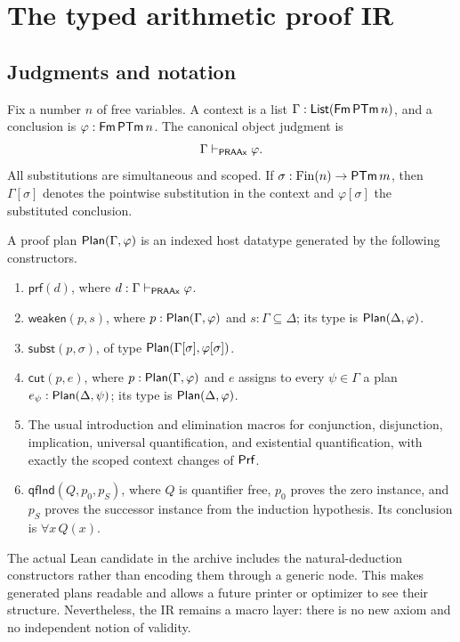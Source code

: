 \section{The typed arithmetic proof IR}\label{sec:typed-ir}

\subsection{Judgments and notation}

Fix a number \(n\) of free variables.  A context is a list
\(\Gamma:\mathsf{List}(\mathsf{Fm}\,\mathsf{PTm}\,n)\), and a conclusion is
\(\varphi:\mathsf{Fm}\,\mathsf{PTm}\,n\).  The canonical object judgment is
\[
  \Gamma\vdash_{\mathsf{PRAAx}}\varphi.
\]
All substitutions are simultaneous and scoped.  If
\(\sigma:\mathrm{Fin}(n)\to\mathsf{PTm}\,m\), then
\(\Gamma[\sigma]\) denotes the pointwise substitution in the context and
\(\varphi[\sigma]\) the substituted conclusion.

\begin{definition}
A proof plan \(\mathsf{Plan}(\Gamma,\varphi)\) is an indexed host datatype generated by the following
constructors.

\begin{enumerate}
\item \(\mathsf{prf}(d)\), where \(d:\Gamma\vdash_{\mathsf{PRAAx}}\varphi\).
\item \(\mathsf{weaken}(p,s)\), where \(p:\mathsf{Plan}(\Gamma,\varphi)\) and
      \(s:\Gamma\subseteq\Delta\); its type is \(\mathsf{Plan}(\Delta,\varphi)\).
\item \(\mathsf{subst}(p,\sigma)\), of type
      \(\mathsf{Plan}(\Gamma[\sigma],\varphi[\sigma])\).
\item \(\mathsf{cut}(p,e)\), where \(p:\mathsf{Plan}(\Gamma,\varphi)\) and
      \(e\) assigns to every \(\psi\in\Gamma\) a plan \(e_\psi:\mathsf{Plan}(\Delta,\psi)\);
      its type is \(\mathsf{Plan}(\Delta,\varphi)\).
\item The usual introduction and elimination macros for conjunction, disjunction, implication,
      universal quantification, and existential quantification, with exactly the scoped context
      changes of \(\mathsf{Prf}\).
\item \(\mathsf{qfInd}(Q,p_0,p_S)\), where \(Q\) is quantifier free,
      \(p_0\) proves the zero instance, and \(p_S\) proves the successor instance from the induction
      hypothesis.  Its conclusion is \(\forall x\,Q(x)\).
\end{enumerate}
\end{definition}

The actual Lean candidate in the archive includes the natural-deduction constructors rather than
encoding them through a generic  node.  This makes generated plans readable and allows a
future printer or optimizer to see their structure.  Nevertheless, the IR remains a macro layer:
there is no new axiom and no independent notion of validity.

